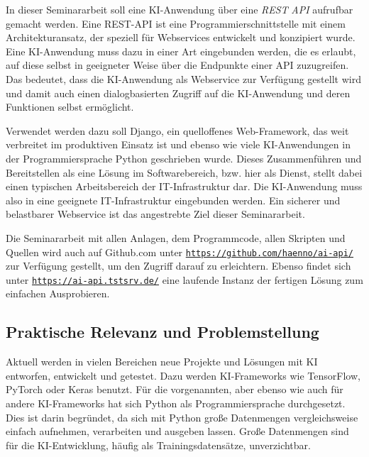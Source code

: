 \documentclass[12pt,oneside,titlepage,listof=totoc,bibliography=totoc]{scrartcl}
\newcommand{\code}[1]{\colorbox{code-gray}{\texttt{#1}}}
\begin{document}
In dieser Seminararbeit soll eine \ac{KI}-Anwendung über eine \textit{\ac{REST}} \textit{\ac{API}} aufrufbar gemacht werden. Eine \ac{REST}-\ac{API} ist eine Programmierschnittstelle mit einem Architekturansatz, der speziell für Webservices entwickelt und konzipiert wurde. Eine \ac{KI}-Anwendung muss dazu in einer Art eingebunden werden, die es erlaubt, auf diese selbst in geeigneter Weise über die Endpunkte einer \ac{API} zuzugreifen. Das bedeutet, dass die \ac{KI}-Anwendung als Webservice zur Verfügung gestellt wird und damit auch einen dialogbasierten Zugriff auf die \ac{KI}-Anwendung und deren Funktionen selbst ermöglicht. 

Verwendet werden dazu soll Django, ein quelloffenes Web-Framework, das weit verbreitet im produktiven Einsatz ist und ebenso wie viele \ac{KI}-Anwendungen in der Programmiersprache Python geschrieben wurde. Dieses Zusammenführen und Bereitstellen als eine Lösung im Softwarebereich, bzw. hier als Dienst, stellt dabei einen typischen Arbeitsbereich der IT-Infrastruktur dar. Die \ac{KI}-Anwendung muss also in eine geeignete IT-Infrastruktur eingebunden werden. Ein sicherer und belastbarer Webservice ist das angestrebte Ziel dieser Seminararbeit. 

Die Seminararbeit mit allen Anlagen, dem Programmcode, allen Skripten und Quellen wird auch auf Github.com unter \code{\url{https://github.com/haenno/ai-api/}} zur Verfügung gestellt, um den Zugriff darauf zu erleichtern. Ebenso findet sich unter \code{\url{https://ai-api.tstsrv.de/}} eine laufende Instanz der fertigen Lösung zum einfachen Ausprobieren. 





\subsection{Praktische Relevanz und Problemstellung}

Aktuell werden in vielen Bereichen neue Projekte und Lösungen mit \ac{KI} entworfen, entwickelt und getestet. Dazu werden \ac{KI}-Frameworks wie TensorFlow, PyTorch oder Keras benutzt. Für die vorgenannten, aber ebenso wie auch für andere \ac{KI}-Frameworks hat sich Python als Programmiersprache durchgesetzt. Dies ist darin begründet, da sich mit Python große Datenmengen vergleichsweise einfach aufnehmen, verarbeiten und ausgeben lassen. Große Datenmengen sind für die \ac{KI}-Entwicklung, häufig \zb als Trainingsdatensätze, unverzichtbar. 
\end{document}
